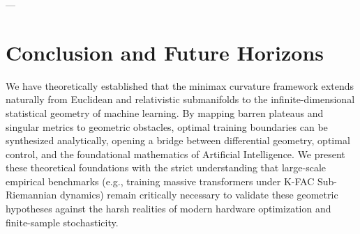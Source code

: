 \documentclass[11pt,reqno]{amsart}
\theoremstyle{definition}
\numberwithin{equation}{section}
\begin{document}
---

\section{Conclusion and Future Horizons}
We have theoretically established that the minimax curvature framework extends naturally from Euclidean and relativistic submanifolds to the infinite-dimensional statistical geometry of machine learning. By mapping barren plateaus and singular metrics to geometric obstacles, optimal training boundaries can be synthesized analytically, opening a bridge between differential geometry, optimal control, and the foundational mathematics of Artificial Intelligence. We present these theoretical foundations with the strict understanding that large-scale empirical benchmarks (e.g., training massive transformers under K-FAC Sub-Riemannian dynamics) remain critically necessary to validate these geometric hypotheses against the harsh realities of modern hardware optimization and finite-sample stochasticity.
\end{document}
